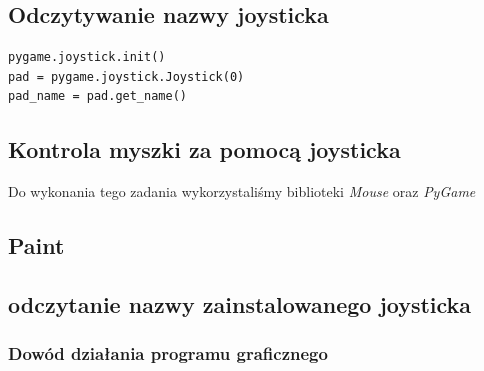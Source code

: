\documentclass[a4paper,12pt]{extarticle}  %
\begin{document}
\subsection{Odczytywanie nazwy joysticka}
\begin{lstlisting}
pygame.joystick.init()
pad = pygame.joystick.Joystick(0)
pad_name = pad.get_name()
\end{lstlisting}
\subsection{Kontrola myszki za pomocą joysticka}
Do wykonania tego zadania wykorzystaliśmy biblioteki \emph{Mouse} oraz \emph{PyGame}

\cleardoublepage
\subsection{Paint}
\subsection{odczytanie nazwy zainstalowanego joysticka}

\subsubsection{Dowód działania programu graficznego}
\begin{figure}[H]
   \centering
\end{figure}
\end{document}
